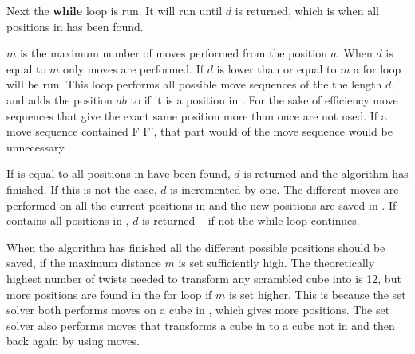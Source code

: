 Next the \textbf{while} loop is run. It will run until $d$ is returned, which is when all positions in  has been found.

$m$ is the maximum number of  moves performed from the position $a$. When $d$ is equal to $m$ only  moves are performed.
If $d$ is lower than or equal to $m$ a for loop will be run. This loop performs all possible move sequences of the the length $d$, and adds the position $ab$ to  if it is a position in . 
For the sake of efficiency move sequences that give the exact same position more than once are not used. If a move sequence contained F F', that part would  of the move sequence would be unnecessary. 

If  is equal to  all positions in  have been found, $d$ is returned and the algorithm has finished. 
If this is not the case, $d$ is incremented by one. 
The different  moves are performed on all the current  positions in  and the new  positions are saved in .
If  contains all positions in , $d$ is returned -- if not the while loop continues.



When the algorithm has finished all the different possible  positions should be saved, if the maximum distance $m$ is set sufficiently high. The theoretically highest number of twists needed to transform any scrambled cube into  is 12, but more positions are found in the for loop if $m$ is set higher. This is because the set solver both performs  moves on a cube in , which gives more  positions. The set solver also performs moves that transforms a cube in  to a cube not in  and then back again by using  moves.
